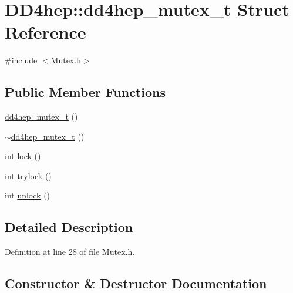 \hypertarget{struct_d_d4hep_1_1dd4hep__mutex__t}{}\section{D\+D4hep\+:\+:dd4hep\+\_\+mutex\+\_\+t Struct Reference}
\label{struct_d_d4hep_1_1dd4hep__mutex__t}


{\ttfamily \#include $<$Mutex.\+h$>$}

\subsection*{Public Member Functions}
\begin{DoxyCompactItemize}
\item 
\hyperlink{struct_d_d4hep_1_1dd4hep__mutex__t_a9468728fad83735ab6a3a52157519a3e}{dd4hep\+\_\+mutex\+\_\+t} ()
\item 
\hyperlink{struct_d_d4hep_1_1dd4hep__mutex__t_addd31c44ebdd2c7097c4778b3f2b9cb8}{$\sim$dd4hep\+\_\+mutex\+\_\+t} ()
\item 
int \hyperlink{struct_d_d4hep_1_1dd4hep__mutex__t_a7d871d008c53d730b892d64cf0b49e29}{lock} ()
\item 
int \hyperlink{struct_d_d4hep_1_1dd4hep__mutex__t_a71b8088c0188d51c0433eda5556e4189}{trylock} ()
\item 
int \hyperlink{struct_d_d4hep_1_1dd4hep__mutex__t_af41a64ce1a44de41262fb127d4737d34}{unlock} ()
\end{DoxyCompactItemize}


\subsection{Detailed Description}


Definition at line 28 of file Mutex.\+h.



\subsection{Constructor \& Destructor Documentation}
\hypertarget{struct_d_d4hep_1_1dd4hep__mutex__t_a9468728fad83735ab6a3a52157519a3e}{}\label{struct_d_d4hep_1_1dd4hep__mutex__t_a9468728fad83735ab6a3a52157519a3e} 
